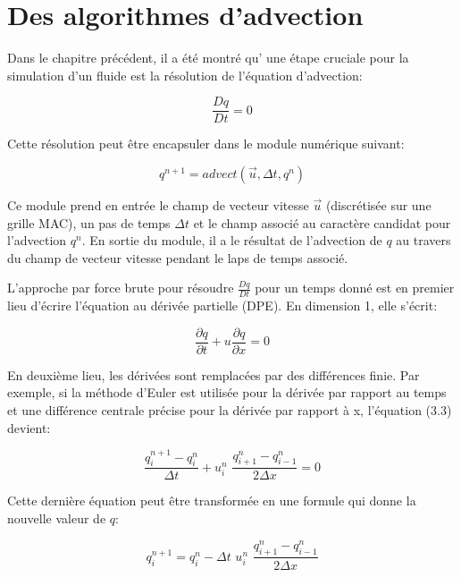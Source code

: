 \documentclass[11pt]{report}
\begin{document}
\chapter{Des algorithmes d'advection}

Dans le chapitre précédent, 	il a été montré qu' une étape cruciale pour la simulation d'un fluide est la résolution de l'équation d'advection:

\begin{equation}
\frac{Dq}{Dt} = 0
\end{equation}

Cette résolution peut être encapsuler dans le module numérique suivant:

\begin{equation}
q^{n+1} = advect(\overrightarrow{u}, \Delta t, q^n)
\end{equation}

Ce module prend en entrée le champ de vecteur vitesse $ \overrightarrow{u} $ (discrétisée sur une grille MAC), un pas de temps $ \Delta t $ et le champ associé au caractère candidat pour l'advection $ q^n $. En sortie du module, il a le résultat de l'advection de $q$ au travers du champ de vecteur vitesse pendant le laps de temps associé. \newline

L'approche par force brute pour résoudre $ \frac{Dq}{Dt} $ pour un temps donné est en premier lieu d'écrire l'équation au dérivée partielle (DPE). En dimension 1, elle s'écrit:

\begin{equation}
\frac{\partial q}{\partial t} + u \frac{\partial q}{\partial x} = 0
\end{equation}

En deuxième lieu, les dérivées sont remplacées par des différences finie. Par exemple, si la méthode d'Euler est utilisée pour la dérivée par rapport au temps et une différence centrale précise pour la dérivée par rapport à x, l'équation (3.3) devient:

\begin{equation}
\frac{q_i^{n+1} - q_i^n}{\Delta t} + u_i^n \,\, \frac{q_{i+1}^n - q_{i-1}^n}{2 \Delta x} = 0
\end{equation}

Cette dernière équation peut être transformée en une formule qui donne la nouvelle valeur de $ q $:

\begin{equation}
q_i^{n+1} = q_i^n - \Delta t \,\, u_i^n \,\, \frac{q_{i+1}^n - q_{i-1}^n}{2 \Delta x}
\end{equation}
\end{document}
